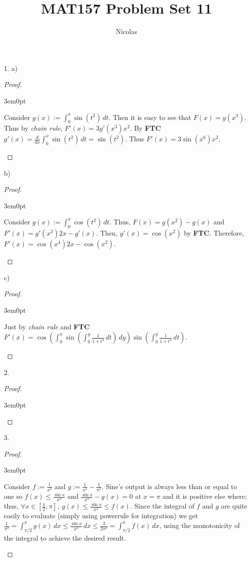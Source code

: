 \documentclass[11pt]{article}
\title{MAT157 Problem Set 11}
\author{Nicolas}
\newenvironment{myproof}
{\begin{proof} \begin{adjustwidth}{3em}{0pt}$ $\par\nobreak\ignorespaces}
{\end{adjustwidth} \end{proof}}
\begin{document}
\maketitle
\begin{flushleft}

1. a)


\begin{myproof}
Consider $g(x) := \int_0^x \sin(t^2)\,dt$. Then it is easy to see that $F(x) = g(x^3)$. Thus by \textit{chain rule}, $F'(x) = 3g'(x^3)x^2$. By \textbf{FTC} $g'(x) = \frac{d}{dx}\int_{0}^x \sin(t^2)\,dt = \sin(t^2)$. Thus $F'(x) = 3\sin(x^6)x^2$.
\end{myproof}

b)

\begin{myproof}
Consider $g(x) := \int_0^x \cos (t^2)\,dt$. Thus, $F(x) = g(x^2) - g(x)$ and $F'(x) = g'(x^2)2x - g'(x)$. Then, $g'(x) = \cos (x^2)$ by \textbf{FTC}. Therefore, $F'(x) = \cos(x^4)2x - \cos(x^2)$.
\end{myproof}

c)

\begin{myproof}
Just by \textit{chain rule} and \textbf{FTC} $F'(x) = \cos(\int_0^x \sin(\int_0^y \frac{1}{1+t^4} \,dt ) \,dy) \sin(\int_0^y \frac{1}{1+t^4} \,dt)$.
\end{myproof}

\newpage

2.

\begin{myproof}

\end{myproof}

\newpage

3.
\begin{myproof}
Consider $f := \frac{1}{x^3}$ and $g := \frac{1}{x^3} - \frac{1}{\pi^2}$. Sine's output is always less than or equal to one so $f(x) \leq \frac{ \sin x}{x^3}$ and $\frac{ \sin x}{x^3} - g(x) = 0$ at $x = \pi$ and it is positive else where; thus, $ \forall x \in [ \frac{\pi}{2}, \pi ], \ g(x) \leq \frac{ \sin x}{x^3} \leq f(x)$. Since the integral of $f$ and $g$ are quite easily to evaluate (simply using powerrule for integration) we get $\frac{1}{\pi^2} = \int_{\pi/2}^\pi g(x) \,dx  \leq \frac{\sin x}{x^3} \,dx \leq \frac{3}{2\pi^2} = \int_{\pi/2}^\pi f(x) \,dx$, using the monotonicity of the integral to achieve the desired result.
\end{myproof}

\newpage


\end{flushleft}
\end{document}
